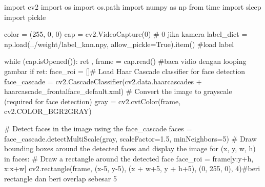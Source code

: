 \documentclass[
  letterpaper,
  DIV=11,
  numbers=noendperiod]{scrreprt}
\newenvironment{Shaded}{\begin{snugshade}}{\end{snugshade}}
\newcommand{\CommentTok}[1]{\textcolor[rgb]{0.37,0.37,0.37}{#1}}
\newcommand{\ControlFlowTok}[1]{\textcolor[rgb]{0.00,0.23,0.31}{#1}}
\newcommand{\DecValTok}[1]{\textcolor[rgb]{0.68,0.00,0.00}{#1}}
\newcommand{\FloatTok}[1]{\textcolor[rgb]{0.68,0.00,0.00}{#1}}
\newcommand{\ImportTok}[1]{\textcolor[rgb]{0.00,0.46,0.62}{#1}}
\newcommand{\KeywordTok}[1]{\textcolor[rgb]{0.00,0.23,0.31}{#1}}
\newcommand{\NormalTok}[1]{\textcolor[rgb]{0.00,0.23,0.31}{#1}}
\newcommand{\OperatorTok}[1]{\textcolor[rgb]{0.37,0.37,0.37}{#1}}
\newcommand{\StringTok}[1]{\textcolor[rgb]{0.13,0.47,0.30}{#1}}
\newcommand{\VariableTok}[1]{\textcolor[rgb]{0.07,0.07,0.07}{#1}}
\begin{document}
\begin{Shaded}
\begin{Highlighting}[]
\ImportTok{import}\NormalTok{ cv2}
\ImportTok{import}\NormalTok{ os}
\ImportTok{import}\NormalTok{ os.path}
\ImportTok{import}\NormalTok{ numpy }\ImportTok{as}\NormalTok{ np}
\ImportTok{from}\NormalTok{ time }\ImportTok{import}\NormalTok{ sleep}
\ImportTok{import}\NormalTok{ pickle}


\NormalTok{color }\OperatorTok{=}\NormalTok{ (}\DecValTok{255}\NormalTok{, }\DecValTok{0}\NormalTok{, }\DecValTok{0}\NormalTok{)}
\NormalTok{cap }\OperatorTok{=}\NormalTok{ cv2.VideoCapture(}\DecValTok{0}\NormalTok{) }\CommentTok{\# 0 jika kamera}
\NormalTok{label\_dict }\OperatorTok{=}\NormalTok{ np.load(}\StringTok{\textquotesingle{}../weight/label\_knn.npy\textquotesingle{}}\NormalTok{, allow\_pickle}\OperatorTok{=}\VariableTok{True}\NormalTok{).item() }\CommentTok{\#load label}


\ControlFlowTok{while}\NormalTok{ (cap.isOpened()):}
\NormalTok{    ret , frame }\OperatorTok{=}\NormalTok{ cap.read() }\CommentTok{\#baca vidio dengan looping gambar}
    \ControlFlowTok{if}\NormalTok{ ret:}
\NormalTok{        face\_roi }\OperatorTok{=}\NormalTok{ []}\CommentTok{\# Load Haar Cascade classifier for face detection}
\NormalTok{        face\_cascade }\OperatorTok{=}\NormalTok{ cv2.CascadeClassifier(cv2.data.haarcascades }\OperatorTok{+} \StringTok{\textquotesingle{}haarcascade\_frontalface\_default.xml\textquotesingle{}}\NormalTok{)}
        \CommentTok{\# Convert the image to grayscale (required for face detection)}
\NormalTok{        gray }\OperatorTok{=}\NormalTok{ cv2.cvtColor(frame, cv2.COLOR\_BGR2GRAY)}

        \CommentTok{\# Detect faces in the image using the face\_cascade}
\NormalTok{        faces }\OperatorTok{=}\NormalTok{ face\_cascade.detectMultiScale(gray, scaleFactor}\OperatorTok{=}\FloatTok{1.5}\NormalTok{, minNeighbors}\OperatorTok{=}\DecValTok{5}\NormalTok{)}
        \CommentTok{\# Draw bounding boxes around the detected faces and display the image}
        \ControlFlowTok{for}\NormalTok{ (x, y, w, h) }\KeywordTok{in}\NormalTok{ faces:}
            \CommentTok{\# Draw a rectangle around the detected face}
\NormalTok{            face\_roi }\OperatorTok{=}\NormalTok{ frame[y:y}\OperatorTok{+}\NormalTok{h, x:x}\OperatorTok{+}\NormalTok{w]}
\NormalTok{            cv2.rectangle(frame, (x}\OperatorTok{{-}}\DecValTok{5}\NormalTok{, y}\OperatorTok{{-}}\DecValTok{5}\NormalTok{), (x }\OperatorTok{+}\NormalTok{ w}\OperatorTok{+}\DecValTok{5}\NormalTok{, y }\OperatorTok{+}\NormalTok{ h}\OperatorTok{+}\DecValTok{5}\NormalTok{), (}\DecValTok{0}\NormalTok{, }\DecValTok{255}\NormalTok{, }\DecValTok{0}\NormalTok{), }\DecValTok{4}\NormalTok{)}\CommentTok{\#beri rectangle dan beri overlap sebesar 5}


\end{Highlighting}
\end{Shaded}
\end{document}
